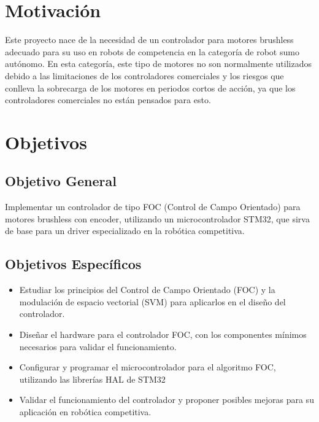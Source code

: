 \documentclass[11pt]{report}
\begin{document}
\newpage
\section{Motivación}
Este proyecto nace de la necesidad de un controlador para motores brushless adecuado para su uso en robots de competencia en la categoría de robot sumo autónomo. En esta categoría, este tipo de motores no son normalmente utilizados debido a las limitaciones de los controladores comerciales y los riesgos que conlleva la sobrecarga de los motores en periodos cortos de acción, ya que los controladores comerciales no están pensados para esto.

\section{Objetivos}
\subsection{Objetivo General}
Implementar un controlador de tipo FOC (Control de Campo Orientado) para motores brushless con encoder, utilizando un microcontrolador STM32, que sirva de base para un driver especializado en la robótica competitiva.

\subsection{Objetivos Específicos}
\begin{itemize}
	\item Estudiar los principios del Control de Campo Orientado (FOC) y la modulación de espacio vectorial (SVM) para aplicarlos en el diseño del controlador.
	\item Diseñar el hardware para el controlador FOC, con los componentes mínimos necesarios para validar el funcionamiento.
	\item Configurar y programar el microcontrolador para el algoritmo FOC, utilizando las librerías HAL de STM32
	\item Validar el funcionamiento del controlador y proponer posibles mejoras para su aplicación en robótica competitiva.
\end{itemize}

\newpage
\end{document}
